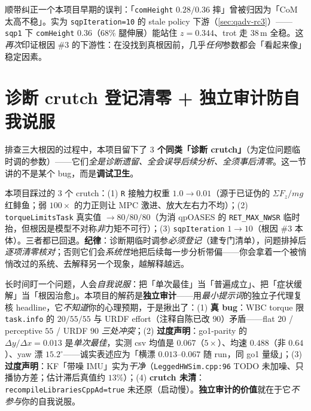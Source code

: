 \begin{note}
顺带纠正一个本项目早期的误判：「\texttt{comHeight} $0.28/0.36$ 摔」曾被归因为「CoM 太高不稳」。实为 \texttt{sqpIteration=10} 的 stale policy 下游（\cref{sec:qadv-rc3}）——\texttt{sqp1} 下 \texttt{comHeight} $0.36$（$68\%$ 腿伸展）能站住 $z{=}0.344$、trot 走 $38$\,m 全稳。这\emph{再次}印证根因 \#3 的下游性：在没找到真根因前，几乎\emph{任何}参数都会「看起来像」稳定因素。
\end{note}

\section{诊断 crutch 登记清零 + 独立审计防自我说服}
\label{sec:qadv-crutch}

排查三大根因的过程中，本项目留下了 \textbf{$3$ 个同类「诊断 crutch」}（为定位问题临时调的参数）——它们\emph{全是诊断遗留、全会误导后续分析、全须事后清零}。这一节讲的不是某个 bug，而是\textbf{调试卫生}。

\begin{insight}\label{ins:qadv-crutch-log}
本项目踩过的 $3$ 个 crutch：(1) \texttt{R} 接触力权重 $1.0\to0.01$（源于已证伪的 $\Sigma F_z/mg$ 红鲱鱼；弱 $100\times$ 的力正则让 MPC 激进、放大左右力不均）；(2) \texttt{torqueLimitsTask} 真实值 $\to80/80/80$（为消 qpOASES 的 \texttt{RET\_MAX\_NWSR} 临时抬，但根因是模型不对称\emph{非}力矩不可行）；(3) \texttt{sqpIteration} $1\to10$（根因 \#3 本体）。三者都已回退。\textbf{纪律}：诊断期临时调参\emph{必须登记}（建专门清单），问题排掉后\emph{逐项清零核对}；否则它们会\emph{系统性}地把后续每一步分析带偏——你会拿着一个被悄悄改过的系统、去解释另一个现象，越解释越远。
\end{insight}

\begin{insight}[独立审计防自我说服]\label{ins:qadv-audit}
长时间盯一个问题，人会\emph{自我说服}：把「单次最佳」当「普遍成立」、把「症状缓解」当「根因治愈」。本项目的解药是\textbf{独立审计}——用\emph{最小提示词}的独立子代理复核 headline，它\emph{不知道}你的心理预期，于是揪出了：(1) \textbf{真 bug}：WBC torque 限 \texttt{task.info} 的 $20/55/55$ 与 URDF effort（注释自陈已改 $90$）矛盾——flat $20$ / perceptive $55$ / URDF $90$ \emph{三处冲突}；(2) \textbf{过度声明}：go1-parity 的 $\Delta y/\Delta x{=}0.013$ 是\emph{单次最佳}，实测 csv 均值是 $0.067$（$5\times$）、均速 $0.488$（非 $0.64$）、yaw 漂 $15.2^\circ$——诚实表述应为「横漂 $0.013$–$0.067$ 随 run，同 go1 量级」；(3) \textbf{过度声明}：KF「带噪 IMU」实为\emph{干净}（\texttt{LeggedHWSim.\allowbreak cpp:96} TODO 未加噪、只播协方差；估计滞后真值约 $13\%$）；(4) \textbf{crutch 未清}：\texttt{recompileLibrariesCppAd=true} 未还原（启动慢）。\textbf{独立审计的价值}就在于它\emph{不参与}你的自我说服。
\end{insight}

